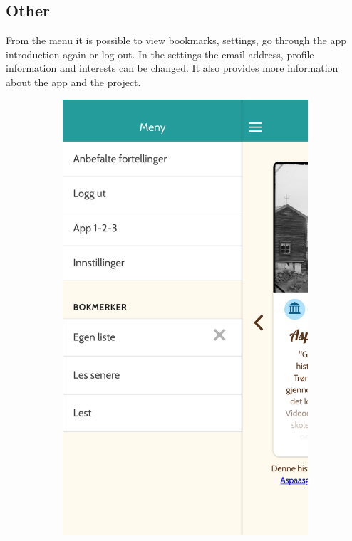 \begin{appendices}
\clearpage
\section{Other}
From the menu it is possible to view bookmarks, settings, go through the app introduction again or log out. In the settings the email address, profile information and interests can be changed. It also provides more information about the app and the project. 

	
	\begin{figure}[h!]
		\ContinuedFloat
		\centering
		\begin{subfigure}[h]{0.3\textwidth}
			\includegraphics[width=\textwidth]{fig/screenshot_menu}

\end{subfigure}
\end{figure}
\end{appendices}
